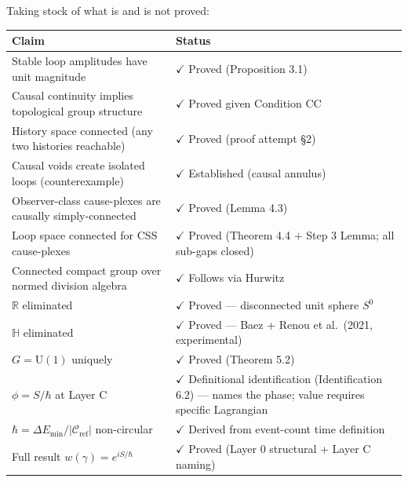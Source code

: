 \documentclass[11pt]{article}
\theoremstyle{definition}
\theoremstyle{remark}
\begin{document}
Taking stock of what is and is not proved:

{\def\LTcaptype{none} %
\begin{longtable}[]{@{}
  >{\raggedright\arraybackslash}p{}
  >{\raggedright\arraybackslash}p{}@{}}
\toprule\noalign{}
\begin{minipage}[b]{\linewidth}\raggedright
Claim
\end{minipage} & \begin{minipage}[b]{\linewidth}\raggedright
Status
\end{minipage} \\
\midrule\noalign{}
\endhead
\bottomrule\noalign{}
\endlastfoot
Stable loop amplitudes have unit magnitude & \(\checkmark\) Proved
(Proposition 3.1) \\
Causal continuity implies topological group structure & \(\checkmark\)
Proved given Condition CC \\
History space connected (any two histories reachable) & \(\checkmark\)
Proved (proof attempt §2) \\
Causal voids create isolated loops (counterexample) & \(\checkmark\)
Established (causal annulus) \\
Observer-class cause-plexes are causally simply-connected &
\(\checkmark\) Proved (Lemma 4.3) \\
Loop space connected for CSS cause-plexes & \(\checkmark\) Proved
(Theorem 4.4 + Step 3 Lemma; all sub-gaps closed) \\
Connected compact group over normed division algebra & \(\checkmark\)
Follows via Hurwitz \\
\(\mathbb{R}\) eliminated & \(\checkmark\) Proved --- disconnected unit
sphere \(S^0\) \\
\(\mathbb{H}\) eliminated & \(\checkmark\) Proved --- Baez
\cite{Baez2012} + Renou et al.~(2021, experimental) \\
\(G = \mathrm{U}(1)\) uniquely & \(\checkmark\) Proved (Theorem 5.2) \\
\(\phi = S/\hbar\) at Layer C & \(\checkmark\) Definitional
identification (Identification 6.2) --- names the phase; value requires
specific Lagrangian \\
\(\hbar = \Delta E_{\min}/\lvert\mathcal{C}_{\text{ref}}\rvert\)
non-circular & \(\checkmark\) Derived from event-count time
definition \\
Full result \(w(\gamma) = e^{iS/\hbar}\) & \(\checkmark\) Proved (Layer
0 structural + Layer C naming) \\
\end{longtable}
}
\end{document}
